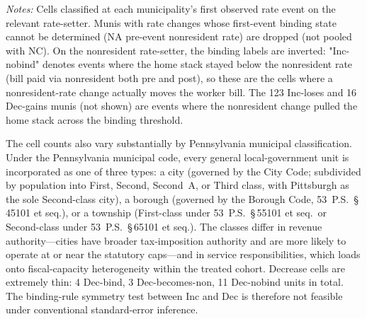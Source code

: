 \documentclass[12pt]{article}
\begin{document}
\begin{table}[H]
    \centering
    \caption{Cell composition by rate-setter (drop sample, post-NC-fix)}
    \label{tab:cell-counts}
    \small
    \vspace{0.3em}
    \begin{minipage}{0.95\textwidth}
        \footnotesize \textit{Notes:} Cells classified at each municipality's first
        observed rate event on the relevant rate-setter. Munis with rate changes
        whose first-event binding state cannot be determined (NA pre-event
        nonresident rate) are dropped (not pooled with NC). On the nonresident rate-setter, the binding labels are inverted: "Inc-nobind" denotes events where the home stack stayed below the nonresident rate (bill paid via nonresident both pre and post), so these are the cells where a nonresident-rate change actually moves the worker bill. The 123 Inc-loses and 16 Dec-gains munis (not shown) are events where the nonresident change pulled the home stack across the binding threshold.
    \end{minipage}
\end{table}

The cell counts also vary substantially by Pennsylvania municipal
classification. Under the Pennsylvania municipal code, every general
local-government unit is incorporated as one of three types: a
city (governed by the City Code; subdivided by population
into First, Second, Second~A, or Third class, with Pittsburgh as the
sole Second-class city), a borough (governed by the Borough
Code, 53~P.S.~\S\,45101 et seq.), or a township (First-class
under 53~P.S.~\S\,55101 et seq.\ or Second-class under
53~P.S.~\S\,65101 et seq.). The classes differ in revenue
authority---cities have broader tax-imposition authority and are
more likely to operate at or near the statutory caps---and in
service responsibilities, which loads onto fiscal-capacity
heterogeneity within the treated cohort. Decrease cells are
extremely thin: 4 Dec-bind, 3 Dec-becomes-non, 11 Dec-nobind units
in total. The binding-rule symmetry test between Inc and Dec is
therefore not feasible under conventional standard-error inference.
\end{document}
